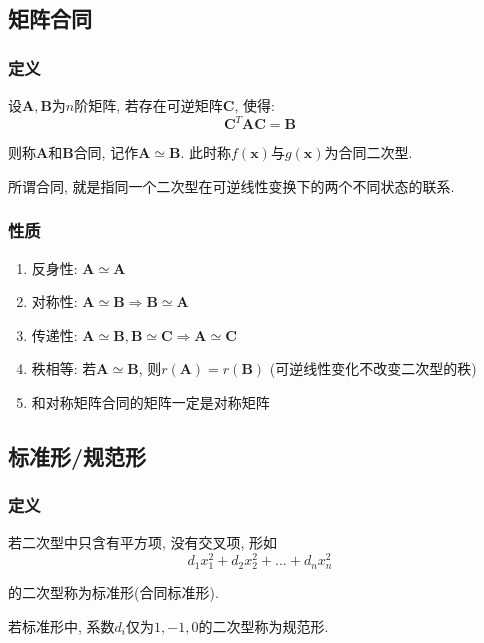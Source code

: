 \subsection{矩阵合同}
\subsubsection{定义}
设$ \bm{A}, \bm{B} $为$ n $阶矩阵, 若存在可逆矩阵$ \bm{C} $, 使得:
\begin{equation*}
\bm{C}^{T}\bm{A}\bm{C}=\bm{B}
\end{equation*}\par
则称$ \bm{A} $和$ \bm{B} $合同, 记作$ \bm{A}\simeq \bm{B} $. 此时称$ f(\bm{x}) $与$ g(\bm{x}) $为合同二次型.\par
所谓合同, 就是指同一个二次型在可逆线性变换下的两个不同状态的联系.
\subsubsection{性质}
\begin{enumerate}
\item 反身性: $ \bm{A}\simeq \bm{A} $
\item 对称性: $ \bm{A}\simeq \bm{B}\Rightarrow \bm{B}\simeq \bm{A} $
\item 传递性: $ \bm{A}\simeq \bm{B}, \bm{B}\simeq \bm{C}\Rightarrow \bm{A}\simeq \bm{C} $
\item 秩相等: 若$\bm{A}\simeq \bm{B}$, 则$r(\bm{A})=r(\bm{B})$ (可逆线性变化不改变二次型的秩)
\item 和对称矩阵合同的矩阵一定是对称矩阵
\end{enumerate}
\subsection{标准形/规范形}
\subsubsection{定义}
若二次型中只含有平方项, 没有交叉项, 形如
\begin{equation*}
d_{1}x_{1}^{2}+d_{2}x_{2}^{2}+... +d_{n}x_{n}^{2}
\end{equation*}\par
的二次型称为标准形(合同标准形).\par
若标准形中, 系数$ d_{i} $仅为$ 1, -1, 0 $的二次型称为规范形.
